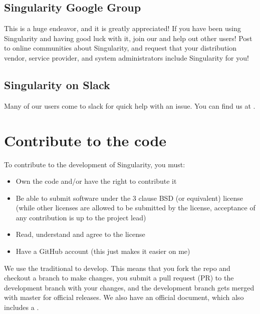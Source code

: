 \documentclass[letterpaper,10pt,english]{sphinxmanual}
\begin{document}
\subsection{Singularity Google Group}
\label{\detokenize{contributing:singularity-google-group}}
This is a huge endeavor, and it is greatly appreciated! If you have been using Singularity and having good luck with it,
join our   and help out other users! Post to online communities about Singularity, and request that your distribution vendor,
service provider, and system administrators include Singularity for you!


\subsection{Singularity on Slack}
\label{\detokenize{contributing:singularity-on-slack}}
Many of our users come to slack for quick help with an issue. You can find us at .


\section{Contribute to the code}
\label{\detokenize{contributing:contribute-to-the-code}}
To contribute to the development of Singularity, you must:
\begin{itemize}
\item {} 
Own the code and/or have the right to contribute it

\item {} 
Be able to submit software under the 3 clause BSD (or equivalent) license (while other licenses are allowed to be submitted by the license, acceptance of any contribution is up to the project lead)

\item {} 
Read, understand and agree to the license

\item {} 
Have a GitHub account (this just makes it easier on me)

\end{itemize}

We use the traditional  to develop. This means that you fork the repo and checkout a branch to make changes, you submit a pull request (PR) to the development branch with your changes, and the development branch gets merged with master for official releases.
We also have an official  document, which also includes a   .
\end{document}
